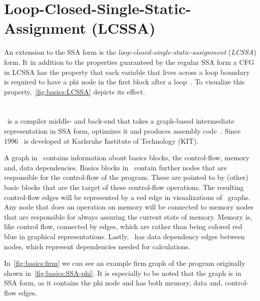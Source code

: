 
\section{Loop-Closed-Single-Static-Assignment (LCSSA)}\label{sec:basics:LCSSA}

An extension to the SSA form is the \textit{loop-closed-single-static-assignment} (\textit{LCSSA}) form.
It in addition to the properties guaranteed by the regular SSA form a CFG in LCSSA has the property that each variable that lives across a loop boundary is required to have a phi node in the first block after a loop~\cite{LLVM_LCSSA}.
To visualize this property,~\cref{fig:basics:LCSSA} depicts its effect.



\section{\libFIRM}\label{sec:basics:firm}

\libFIRM~is a compiler middle- and back-end that takes a graph-based intermediate representation in SSA form, optimizes it and produces assembly code~\cite{libfirm}.
Since 1996 \libFIRM~is developed at Karlsruhe Institute of Technology (KIT).

A graph in \libFIRM~contains information about basics blocks, the control-flow, memory and, data dependencies.
Basics blocks in \libFIRM~contain further nodes that are responsible for the control-flow of the program.
These are pointed to by (other) basic blocks that are the target of these control-flow operations.
The resulting control-flow edges will be represented by a red edge in visualizations of \libFIRM~graphs.
Any node that does an operation on memory will be connected to memory nodes that are responsible for always assuring the current state of memory.
Memory is, like control flow, connected by edges, which are rather than being colored red blue in graphical representations.
Lastly, \libFIRM~has data dependency edges between nodes, which represent dependencies needed for calculations.

In~\cref{fig:basics:firm} we can see an example firm graph of the program originally shown in~\cref{fig:basics:SSA-phi}.
It is especially to be noted that the graph is in SSA form, as it contains the phi node and has both memory, data and, control-flow edges.



